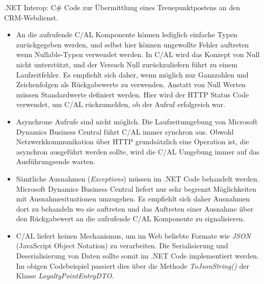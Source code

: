 \begin{program}  %
	\centering
	\caption{.NET Interop: C\# Code zur Übermittlung eines Treuepunktpostens an den CRM-Webdienst.}
	\label{prog:.netWS}

	\begin{JavaCode}
public class WebRequestHandler
{
  private int TransmitEntry(LoyaltyPointEntryDTO dto, string endpoint)
  {
    try
    {
    	HttpClient client = new HttpClient();
    	client.BaseAddress = new Uri(endpoint);
    	client.DefaultRequestHeaders.Accept.Add(new MediaTypeWithQualityHeaderValue("application/json"));
    	HttpContent content = new StringContent(dto.ToJsonString(), Encoding.UTF8, "application/json");
    	
    	HttpResponseMessage response = client.PostAsync(endpoint, content).Result;
    	return (int)response.StatusCode;
    }
    catch (Exception e)
    {
    	return 0;
    }
  }
	\end{JavaCode}
\end{program}

\begin{itemize}
	\item An die aufrufende C/AL Komponente können lediglich einfache Typen zurückgegeben werden, und selbst hier können ungewollte Fehler auftreten wenn Nullable-Typen verwendet werden. In C/AL wird das Konzept von Null nicht unterstützt, und der Versuch Null zurückzuliefern führt zu einem Laufzeitfehler. Es empfiehlt sich daher, wenn möglich nur Ganzzahlen und Zeichenfolgen als Rückgabewerte zu verwenden. Anstatt von Null Werten müssen Standardwerte definiert werden. Hier wird der HTTP Status Code verwendet, um C/AL rückzumelden, ob der Aufruf erfolgreich war.
	\item Asynchrone Aufrufe sind nicht möglich. Die Laufzeitumgebung von Microsoft Dynamics Business Central führt C/AL immer synchron aus. Obwohl Netzwerkkommunikation über HTTP grundsätzlich eine Operation ist, die asynchron ausgeführt werden sollte, wird die C/AL Umgebung immer auf das Ausführungsende warten.
	\item Sämtliche Ausnahmen (\textit{Exceptions}) müssen im .NET Code behandelt werden. Microsoft Dynamics Business Central liefert nur sehr begrenzt Möglichkeiten mit Ausnahmesituationen umzugehen. Es empfiehlt sich daher Ausnahmen dort zu behandeln wo sie auftreten und das Auftreten einer Ausnahme über den Rückgabewert an die aufrufende C/AL Komponente zu signalisieren.
	\item C/AL liefert keinen Mechanismus, um im Web beliebte Formate wie \textit{JSON} (JavaScript Object Notation) zu verarbeiten. Die Serialisierung und Deserialisierung von Daten sollte somit im .NET Code implementiert werden. Im obigen Codebeispiel passiert dies über die Methode \textit{ToJsonString()} der Klasse \textit{LoyaltyPointEntryDTO}. 
\end{itemize}
